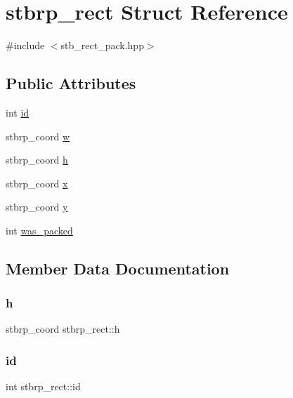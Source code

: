 \hypertarget{structstbrp__rect}{}\section{stbrp\+\_\+rect Struct Reference}
\label{structstbrp__rect}


{\ttfamily \#include $<$stb\+\_\+rect\+\_\+pack.\+hpp$>$}

\subsection*{Public Attributes}
\begin{DoxyCompactItemize}
\item 
int \hyperlink{structstbrp__rect_a92da8626bc99df041c0c3bfd01c25f7a}{id}
\item 
stbrp\+\_\+coord \hyperlink{structstbrp__rect_a248d43f1eb979c1e7b92ba6df431dec5}{w}
\item 
stbrp\+\_\+coord \hyperlink{structstbrp__rect_af68de2dadc7972b7c089d5e0c0558398}{h}
\item 
stbrp\+\_\+coord \hyperlink{structstbrp__rect_a4cc623a3e29f0bc0d3375f6645c84d18}{x}
\item 
stbrp\+\_\+coord \hyperlink{structstbrp__rect_ae3034c1fbf86043b568f5a4dddf946fa}{y}
\item 
int \hyperlink{structstbrp__rect_a74ba347755ce17f2f8a2ea66c612af49}{was\+\_\+packed}
\end{DoxyCompactItemize}


\subsection{Member Data Documentation}
\hypertarget{structstbrp__rect_af68de2dadc7972b7c089d5e0c0558398}{}\label{structstbrp__rect_af68de2dadc7972b7c089d5e0c0558398} 
\subsubsection{\texorpdfstring{h}{h}}
{\footnotesize\ttfamily stbrp\+\_\+coord stbrp\+\_\+rect\+::h}

\hypertarget{structstbrp__rect_a92da8626bc99df041c0c3bfd01c25f7a}{}\label{structstbrp__rect_a92da8626bc99df041c0c3bfd01c25f7a} 
\subsubsection{\texorpdfstring{id}{id}}
{\footnotesize\ttfamily int stbrp\+\_\+rect\+::id}

